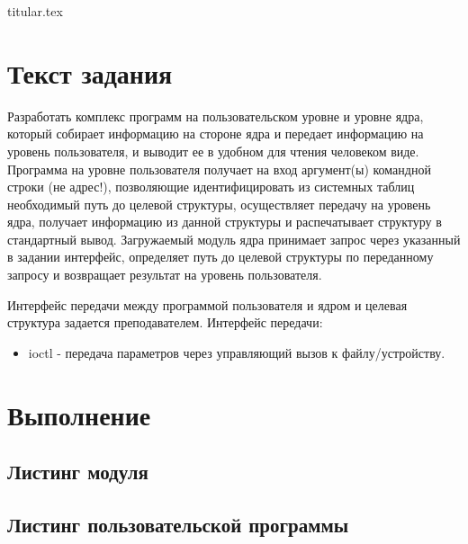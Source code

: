 \documentclass[11pt, a4paper]{article}
\begin{document}
{titular.tex}

\newpage

\section{Текст задания}
Разработать комплекс программ на пользовательском уровне и уровне ядра, который собирает информацию на стороне ядра и передает информацию на уровень пользователя, и выводит ее в удобном для чтения человеком виде. Программа на уровне пользователя получает на вход аргумент(ы) командной строки (не адрес!), позволяющие идентифицировать из системных таблиц необходимый путь до целевой структуры, осуществляет передачу на уровень ядра, получает информацию из данной структуры и распечатывает структуру в стандартный вывод. Загружаемый модуль ядра принимает запрос через указанный в задании интерфейс, определяет путь до целевой структуры по переданному запросу и возвращает результат на уровень пользователя.

\bigskip
\noindent
Интерфейс передачи между программой пользователя и ядром и целевая структура задается преподавателем. Интерфейс передачи:

\begin{itemize}
  \item ioctl - передача параметров через управляющий вызов к файлу/устройству.
\end{itemize}

\section{Выполнение}

\subsection{Листинг модуля}








\subsection{Листинг пользовательской программы}
\end{document}
